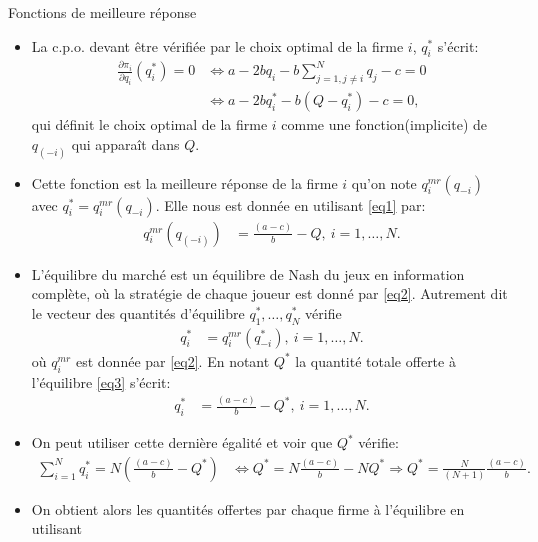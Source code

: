 \begin{frame}[allowframebreaks]{Fonctions de meilleure réponse}
    \begin{itemize}
        \item La c.p.o. devant être vérifiée par le choix optimal de la firme $i$, $q_i^*$ s'écrit: 
        \begin{align}
            \frac{\partial \pi_i}{\partial q_i}(q_i^*) =0 &\Leftrightarrow a-2bq_i -b\sum_{j=1, j\neq i }^N q_j - c = 0\\
            &\Leftrightarrow  a-2bq_i^* -b\left(Q - q_i^*\right) - c= 0,
            \label{eq1}
        \end{align}
         qui définit le choix optimal de la firme $i$ comme une fonction(implicite) de $q_{(-i)}$ qui apparaît 
         dans $Q$. 
         \item Cette fonction est la meilleure réponse de la firme $i$ qu'on note $q^{mr}_i(q_{-i})$ avec 
         $q_i^* = q^{mr}_i(q_{-i})$. Elle nous est donnée en utilisant \eqref{eq1} par: 
        \begin{align} 
            q_i^{mr}(q_{(-i)}) &= \frac{(a-c)}{b} - Q, \ i=1, \ldots, N.
            \label{eq2}
        \end{align}
           \item L'équilibre du marché est un équilibre de Nash du jeux en information complète, où
           la stratégie de chaque joueur est donné par \eqref{eq2}. 
           Autrement dit le vecteur des quantités d'équilibre $q_1^*, \ldots, q_N^*$ vérifie 
           \begin{align}
               q_i^*&= q_i^{mr}(q_{-i}^*), \ i=1, \ldots, N.
               \label{eq3}
           \end{align}
           où $q_i^{mr}$ est donnée par \eqref{eq2}. En notant $Q^*$ la quantité totale offerte 
           à l'équilibre \eqref{eq3} s'écrit:
           \begin{align*}
            q_i^*&=\frac{(a-c)}{b} - Q^*, \ i=1, \ldots, N.
           \end{align*}
           \item On peut utiliser cette dernière égalité et voir que $Q^*$ vérifie:
           \begin{align*}
            \sum_{i=1}^N  q_i^* = N\left(\frac{(a-c)}{b} - Q^*\right)
            &\Leftrightarrow Q^* = N\frac{(a-c)}{b} - NQ^*
            \Rightarrow  Q^* = \frac{N}{(N+1)}\frac{(a-c)}{b}.
           \end{align*}
           \item On obtient alors les quantités offertes par chaque firme à l'équilibre en utilisant

\end{itemize}
\end{frame}
